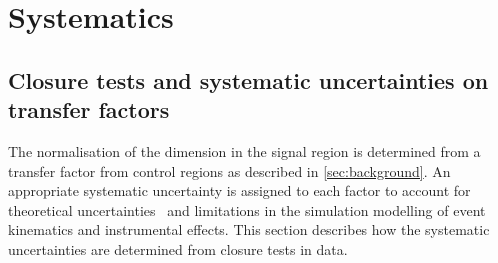 \section{Systematics}
\label{sec:systematics}


%
%
%
%

\subsection{Closure tests and systematic uncertainties on transfer factors\label{sec:bkgd-syst}}

The normalisation of the \mht dimension in the signal region is determined from 
a transfer factor from control regions as described in \ref{sec:background}. 
An appropriate systematic uncertainty is assigned to each factor to
account for theoretical uncertainties~\cite{Bern:2011pa} and
limitations in the simulation modelling of event kinematics and
instrumental effects. This section describes how the systematic
uncertainties are determined from closure tests in data.


